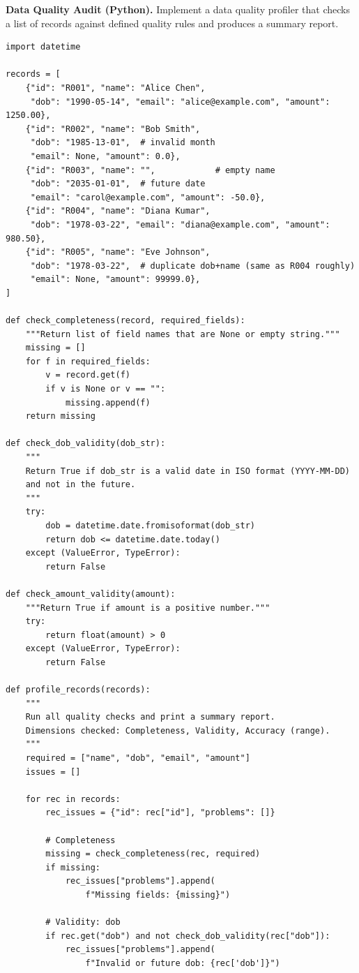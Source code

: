 \pe \textbf{Data Quality Audit (Python).}
Implement a data quality profiler that checks a list of records against
defined quality rules and produces a summary report.

\begin{lstlisting}[style=pyspark, caption={PE2.2: Data quality profiler}]
import datetime

records = [
    {"id": "R001", "name": "Alice Chen",
     "dob": "1990-05-14", "email": "alice@example.com", "amount": 1250.00},
    {"id": "R002", "name": "Bob Smith",
     "dob": "1985-13-01",  # invalid month
     "email": None, "amount": 0.0},
    {"id": "R003", "name": "",            # empty name
     "dob": "2035-01-01",  # future date
     "email": "carol@example.com", "amount": -50.0},
    {"id": "R004", "name": "Diana Kumar",
     "dob": "1978-03-22", "email": "diana@example.com", "amount": 980.50},
    {"id": "R005", "name": "Eve Johnson",
     "dob": "1978-03-22",  # duplicate dob+name (same as R004 roughly)
     "email": None, "amount": 99999.0},
]

def check_completeness(record, required_fields):
    """Return list of field names that are None or empty string."""
    missing = []
    for f in required_fields:
        v = record.get(f)
        if v is None or v == "":
            missing.append(f)
    return missing

def check_dob_validity(dob_str):
    """
    Return True if dob_str is a valid date in ISO format (YYYY-MM-DD)
    and not in the future.
    """
    try:
        dob = datetime.date.fromisoformat(dob_str)
        return dob <= datetime.date.today()
    except (ValueError, TypeError):
        return False

def check_amount_validity(amount):
    """Return True if amount is a positive number."""
    try:
        return float(amount) > 0
    except (ValueError, TypeError):
        return False

def profile_records(records):
    """
    Run all quality checks and print a summary report.
    Dimensions checked: Completeness, Validity, Accuracy (range).
    """
    required = ["name", "dob", "email", "amount"]
    issues = []

    for rec in records:
        rec_issues = {"id": rec["id"], "problems": []}

        # Completeness
        missing = check_completeness(rec, required)
        if missing:
            rec_issues["problems"].append(
                f"Missing fields: {missing}")

        # Validity: dob
        if rec.get("dob") and not check_dob_validity(rec["dob"]):
            rec_issues["problems"].append(
                f"Invalid or future dob: {rec['dob']}")


\end{lstlisting}
